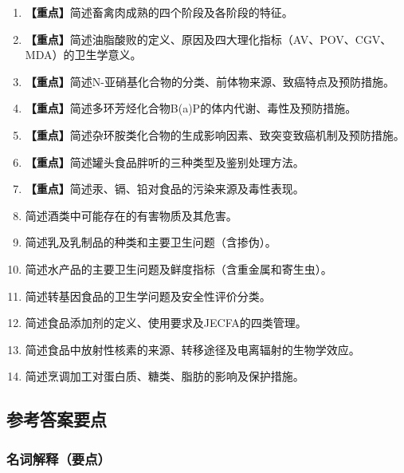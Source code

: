 {\begin{enumerate}[leftmargin=*, itemsep=8pt]
    \item \textbf{【重点】}简述畜禽肉成熟的四个阶段及各阶段的特征。
    \item \textbf{【重点】}简述油脂酸败的定义、原因及四大理化指标（AV、POV、CGV、MDA）的卫生学意义。
    \item \textbf{【重点】}简述N-亚硝基化合物的分类、前体物来源、致癌特点及预防措施。
    \item \textbf{【重点】}简述多环芳烃化合物B(a)P的体内代谢、毒性及预防措施。
    \item \textbf{【重点】}简述杂环胺类化合物的生成影响因素、致突变致癌机制及预防措施。
    \item \textbf{【重点】}简述罐头食品胖听的三种类型及鉴别处理方法。
    \item \textbf{【重点】}简述汞、镉、铅对食品的污染来源及毒性表现。
    \item 简述酒类中可能存在的有害物质及其危害。
    \item 简述乳及乳制品的种类和主要卫生问题（含掺伪）。
    \item 简述水产品的主要卫生问题及鲜度指标（含重金属和寄生虫）。
    \item 简述转基因食品的卫生学问题及安全性评价分类。
    \item 简述食品添加剂的定义、使用要求及JECFA的四类管理。
    \item 简述食品中放射性核素的来源、转移途径及电离辐射的生物学效应。
    \item 简述烹调加工对蛋白质、糖类、脂肪的影响及保护措施。
\end{enumerate}

\subsection*{参考答案要点}

\subsubsection*{名词解释（要点）}

}
